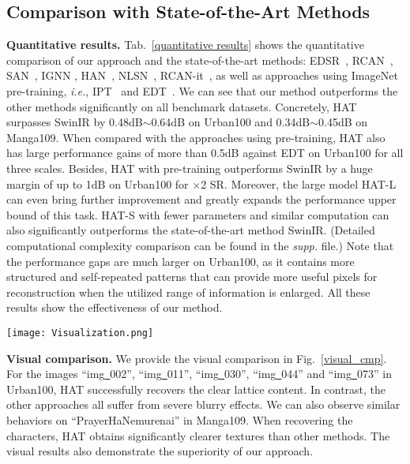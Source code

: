 \documentclass[10pt,twocolumn,letterpaper]{article}
\begin{document}
\subsection{Comparison with State-of-the-Art Methods}

\noindent
\textbf{Quantitative results.}
Tab.~\ref{quantitative results} shows the quantitative comparison of our approach and the state-of-the-art methods: EDSR~\cite{edsr}, RCAN~\cite{rcan}, SAN~\cite{san}, IGNN \cite{ignn}, HAN~\cite{han}, NLSN~\cite{nlsn}, RCAN-it~\cite{rcanit}, as well as approaches using ImageNet pre-training, \textit{i.e.}, IPT~\cite{ipt} and EDT~\cite{edt}. We can see that our method outperforms the other methods significantly on all benchmark datasets. Concretely, HAT surpasses SwinIR by 0.48dB$\sim$0.64dB on Urban100 and 0.34dB$\sim$0.45dB on Manga109. When compared with the approaches using pre-training, HAT also has large performance gains of more than 0.5dB against EDT on Urban100 for all three scales. Besides, HAT with pre-training outperforms SwinIR by a huge margin of up to 1dB on Urban100 for $\times$2 SR. Moreover, the large model HAT-L can even bring further improvement and greatly expands the performance upper bound of this task. HAT-S with fewer parameters and similar computation can also significantly outperforms the state-of-the-art method SwinIR. (Detailed computational complexity comparison can be found in the \textit{supp.} file.) Note that the performance gaps are much larger on Urban100, as it contains more structured and self-repeated patterns that can provide more useful pixels for reconstruction when the utilized range of information is enlarged. All these results show the effectiveness of our method. 

\begin{figure*}[!t]
\begin{center}
\texttt{[image: Visualization.png]}
\end{center}
\vspace{-0.5cm}
\caption{Visual comparison on $\times$4 SR. The patches for comparison are marked with red boxes in the original images. PSNR/SSIM is calculated based on the patches to better reflect the performance difference.}
\label{visual_cmp}
\vspace{-0.5cm}
\end{figure*}

\noindent
\textbf{Visual comparison.}
We provide the visual comparison in Fig.~\ref{visual_cmp}. For the images ``img\underline{~}002'', ``img\underline{~}011'', ``img\underline{~}030'', ``img\underline{~}044'' and ``img\underline{~}073'' in Urban100, HAT successfully recovers the clear lattice content. In contrast, the other approaches all suffer from severe blurry effects. We can also observe similar behaviors on ``PrayerHaNemurenai'' in Manga109. When recovering the characters, HAT obtains significantly clearer textures than other methods. The visual results also demonstrate the superiority of our approach.
\end{document}
